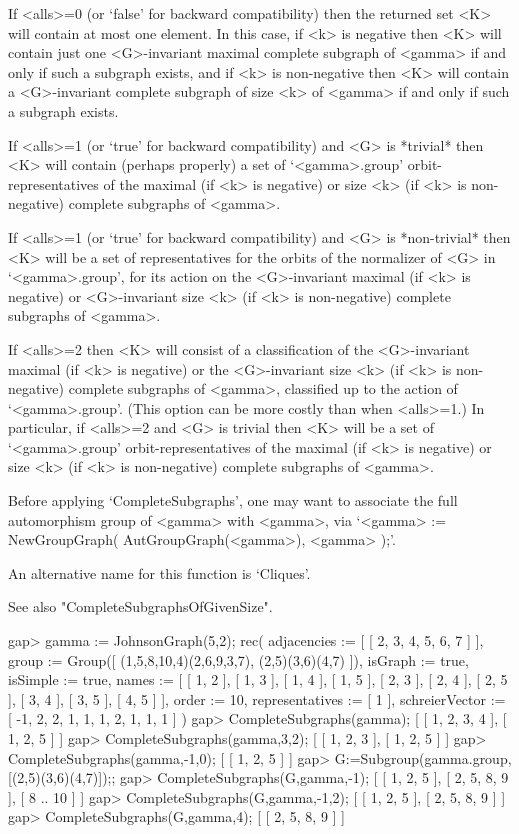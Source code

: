 If <alls>=0 (or `false' for backward compatibility) then the returned
set <K> will contain at most one element. In this case, if <k> is
negative then <K> will contain just one <G>-invariant maximal complete
subgraph of <gamma> if and only if such a subgraph exists, and if <k>
is non-negative then <K> will contain a <G>-invariant complete subgraph
of size <k> of <gamma> if and only if such a subgraph exists.

If <alls>=1 (or `true' for backward compatibility) and <G> is *trivial*
then <K> will contain (perhaps properly) a set of `<gamma>.group'
orbit-representatives of the maximal (if <k> is negative) or size <k>
(if <k> is non-negative) complete subgraphs of <gamma>.

If <alls>=1 (or `true' for backward compatibility) and <G> is *non-trivial*
then <K> will be a set of representatives for the orbits of the normalizer
of <G> in `<gamma>.group', for its action on the <G>-invariant maximal
(if <k> is negative) or <G>-invariant size <k> (if <k> is non-negative)
complete subgraphs of <gamma>.

If <alls>=2 then <K> will consist of a classification of the <G>-invariant
maximal (if <k> is negative) or the <G>-invariant size <k> (if <k> is
non-negative) complete subgraphs of <gamma>, classified up to the action
of `<gamma>.group'.  (This option can be more costly than when <alls>=1.)
In particular, if <alls>=2 and <G> is trivial then <K> will be a set of
`<gamma>.group' orbit-representatives of the maximal (if <k> is negative)
or size <k> (if <k> is non-negative) complete subgraphs of <gamma>.

Before applying `CompleteSubgraphs', one may want to associate the full
automorphism group of <gamma> with <gamma>, via `<gamma> :=
NewGroupGraph( AutGroupGraph(<gamma>), <gamma> );'.

An alternative name for this function is `Cliques'.

See also "CompleteSubgraphsOfGivenSize".

\beginexample
gap> gamma := JohnsonGraph(5,2);
rec( adjacencies := [ [ 2, 3, 4, 5, 6, 7 ] ], 
  group := Group([ (1,5,8,10,4)(2,6,9,3,7), (2,5)(3,6)(4,7) ]), 
  isGraph := true, isSimple := true, 
  names := [ [ 1, 2 ], [ 1, 3 ], [ 1, 4 ], [ 1, 5 ], [ 2, 3 ], [ 2, 4 ], 
      [ 2, 5 ], [ 3, 4 ], [ 3, 5 ], [ 4, 5 ] ], order := 10, 
  representatives := [ 1 ], schreierVector := [ -1, 2, 2, 1, 1, 1, 2, 1, 1, 1 
     ] )
gap> CompleteSubgraphs(gamma);
[ [ 1, 2, 3, 4 ], [ 1, 2, 5 ] ]
gap> CompleteSubgraphs(gamma,3,2);
[ [ 1, 2, 3 ], [ 1, 2, 5 ] ]
gap> CompleteSubgraphs(gamma,-1,0);
[ [ 1, 2, 5 ] ]
gap> G:=Subgroup(gamma.group,[(2,5)(3,6)(4,7)]);;
gap> CompleteSubgraphs(G,gamma,-1);
[ [ 1, 2, 5 ], [ 2, 5, 8, 9 ], [ 8 .. 10 ] ]
gap> CompleteSubgraphs(G,gamma,-1,2);
[ [ 1, 2, 5 ], [ 2, 5, 8, 9 ] ]
gap> CompleteSubgraphs(G,gamma,4);
[ [ 2, 5, 8, 9 ] ]
\endexample

